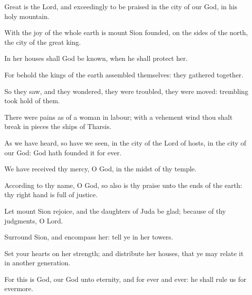 ﻿\item Great is the Lord, and exceedingly to be praised in the city of our God, in his holy mountain.
\item With the joy of the whole earth is mount Sion founded, on the sides of the north, the city of the great king.
\item In her houses shall God be known, when he shall protect her.
\item For behold the kings of the earth assembled themselves: they gathered together.
\item So they saw, and they wondered, they were troubled, they were moved: trembling took hold of them.
\item There were pains as of a woman in labour; with a vehement wind thou shalt break in pieces the ships of Tharsis.
\item As we have heard, so have we seen, in the city of the Lord of hosts, in the city of our God: God hath founded it for ever.
\item We have received thy mercy, O God, in the midst of thy temple.
\item According to thy name, O God, so also is thy praise unto the ends of the earth: thy right hand is full of justice.
\item Let mount Sion rejoice, and the daughters of Juda be glad; because of thy judgments, O Lord.
\item Surround Sion, and encompass her: tell ye in her towers.
\item Set your hearts on her strength; and distribute her houses, that ye may relate it in another generation.
\item For this is God, our God unto eternity, and for ever and ever: he shall rule us for evermore.